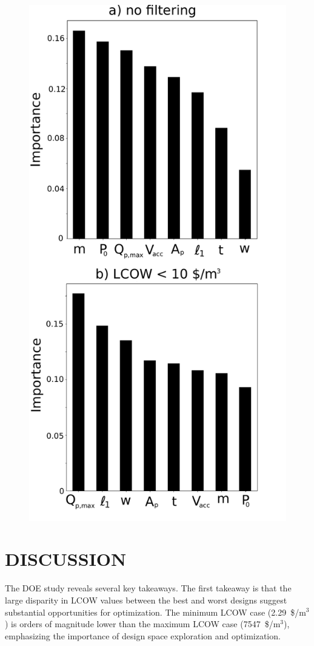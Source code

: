 \documentclass[twocolumn,10pt]{asme2e}
\begin{document}
\begin{figure}
    \centering
    \includegraphics[width=0.6\linewidth]{../figs/importance.pdf}
    \label{fig:importance}
\end{figure}

\section{DISCUSSION}
The DOE study reveals several key takeaways. The first takeaway is that the large disparity in LCOW values between the best and worst designs suggest substantial opportunities for optimization.  The minimum LCOW case (2.29~\$/m$^3$) is orders of magnitude lower than the maximum LCOW case (7547~\$/m$^3$), emphasizing the importance of design space exploration and optimization. 
\end{document}
